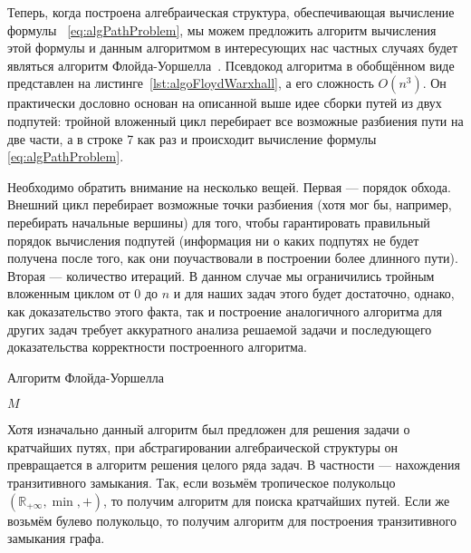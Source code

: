 Теперь, когда построена алгебраическая структура, обеспечивающая вычисление формулы~
\ref{eq:algPathProblem}, мы можем предложить алгоритм вычисления этой формулы и данным алгоритмом в интересующих нас частных случаях будет являться алгоритм Флойда-Уоршелла~\cite{Floyd1962, Bernard1959, Warshall1962}. Псевдокод алгоритма в обобщённом виде представлен на листинге~\ref{lst:algoFloydWarxhall}, а его сложность $O(n^3)$. Он практически дословно основан на описанной выше идее сборки путей из двух подпутей: тройной вложенный цикл перебирает все возможные разбиения пути на две части, а в строке 7 как раз и происходит вычисление формулы~
\ref{eq:algPathProblem}.  

Необходимо обратить внимание на несколько вещей. Первая --- порядок обхода. Внешний цикл перебирает возможные точки разбиения (хотя мог бы, например, перебирать начальные вершины) для того, чтобы гарантировать правильный порядок вычисления подпутей (информация ни о каких подпутях не будет получена после того, как они поучаствовали в построении более длинного пути). Вторая --- количество итераций. В данном случае мы ограничились тройным вложенным циклом от 0 до $n$ и для наших задач этого будет достаточно, однако, как доказательство этого факта, так и построение аналогичного алгоритма для других задач требует аккуратного анализа решаемой задачи и последующего доказательства корректности построенного алгоритма.

\begin{algorithm}
\begin{algorithmic}[1]
\caption{Алгоритм Флойда-Уоршелла}
\label{lst:algoFloydWarxhall}
        \EndFor
      \EndFor
    \EndFor
\State \Return $M$
\EndFunction
\end{algorithmic}
\end{algorithm}

Хотя изначально данный алгоритм был предложен для решения задачи о кратчайших путях, при абстрагировании алгебраической структуры он превращается в алгоритм решения целого ряда задач. В частности --- нахождения транзитивного замыкания. Так, если возьмём тропическое полукольцо $(\mathbb{R}_{+\infty}, \min, +)$, то получим алгоритм для поиска кратчайших путей. Если же возьмём булево полукольцо, то получим алгоритм для построения транзитивного замыкания графа.

